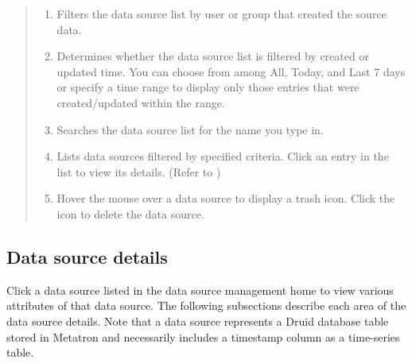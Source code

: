 \documentclass[letterpaper,10pt,english]{sphinxmanual}
\begin{document}
\begin{quote}
\begin{enumerate}
\begin{itemize}
\end{itemize}

\item {} 
 Filters the data source list by user or group that created the source data.

\item {} 
 Determines whether the data source list is filtered by created or updated time. You can choose from among All, Today, and Last 7 days or specify a time range to display only those entries that were created/updated within the range.

\item {} 
 Searches the data source list for the name you type in.

\item {} 
 Lists data sources filtered by specified criteria. Click an entry in the list to view its details. (Refer to {\hyperref[\detokenize{discovery/part02/data_source_detail_view::doc}]{}})

\item {} 
 Hover the mouse over a data source to display a trash icon. Click the icon to delete the data source.

\end{enumerate}
\end{quote}


\subsection{Data source details}
\label{\detokenize{discovery/part02/data_source_detail_view:id1}}\label{\detokenize{discovery/part02/data_source_detail_view::doc}}
Click a data source listed in the data source management home to view various attributes of that data source. The following subsections describe each area of the data source details. Note that a data source represents a Druid database table stored in Metatron and necessarily includes a timestamp column as a time-series table.
\begin{quote}

\begin{figure}[H]
\centering

\noindent{}
\end{figure}
\end{quote}
\end{document}
